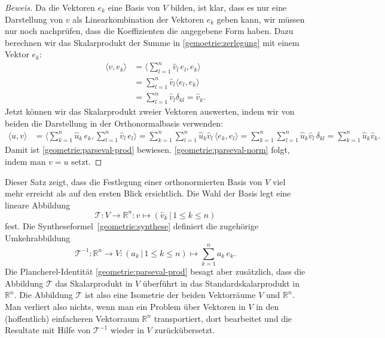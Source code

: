 \begin{proof}[Beweis]
Da die Vektoren $e_k$ eine Basis von $V$ bilden, ist klar, dass es nur
eine Darstellung von $v$ als Linearkombination der Vektoren $e_k$ geben
kann, wir müssen nur noch nachprüfen, dass die Koeffizienten die angegebene
Form haben.
Dazu berechnen wir das Skalarprodukt der Summe in \eqref{gemoetrie:zerlegung}
mit einem Vektor $e_k$:
\begin{align*}
\langle v,e_k\rangle
&=
\biggl\langle \sum_{l=1}^n \hat{v}_l\, e_l,e_k\biggr\rangle
\\
&=
\sum_{l=1}^n \hat{v}_l\langle e_l,e_k\rangle
\\
&=
\sum_{l=1}^n \hat{v}_l\delta_{kl}
=
\hat{v}_k.
\end{align*}
Jetzt können wir das Skalarprodukt zweier Vektoren auswerten, indem
wir von beiden die Darstellung in der Orthonormalbasis verwenden:
\begin{align*}
\langle u,v\rangle
&=
\biggl\langle
\sum_{k=1}^n \hat{u}_k\, e_k,\sum_{l=1}^n \hat{v}_l\, e_l
\biggr\rangle
=
\sum_{k=1}^n \sum_{l=1}^n \hat{u}_k\hat{v}_l\, \langle e_k,e_l\rangle
=
\sum_{k=1}^n \sum_{l=1}^n \hat{u}_k\hat{v}_l\, \delta_{kl}
=
\sum_{k=1}^n \hat{u}_k\hat{v}_k.
\end{align*}
Damit ist \eqref{geometrie:parseval-prod} bewiesen.
\eqref{geometrie:parseval-norm} folgt, indem man $v=u$ setzt.
\end{proof}

Dieser Satz zeigt, dass die Festlegung einer orthonormierten Basis von $V$
viel mehr erreicht als auf den ersten Blick ersichtlich.
Die Wahl der Basis legt eine lineare Abbildung
\[
\mathcal{T}
\colon
V\to \mathbb R^n
:
v \mapsto (\hat{v}_k\,|\, 1\le k\le n)
\]
fest.
Die Syntheseformel~\eqref{geometrie:synthese} definiert die zugehörige
Umkehrabbildung
\[
\mathcal{T}^{-1}
\colon
\mathbb R^n \to V
:
(a_k\,|\,1\le k \le n)
\mapsto
\sum_{k=1}^n a_k\,e_k.
\]
Die Plancherel-Identität
\eqref{geometrie:parseval-prod} besagt aber zusätzlich, dass
die Abbildung $\mathcal{T}$ das Skalarprodukt in $V$ überführt in
das Standardskalarprodukt in $\mathbb R^n$.
Die Abbildung $\mathcal{T}$ ist also eine Isometrie der beiden Vektorräume
$V$ und $\mathbb R^n$.
Man verliert also nichts, wenn man ein Problem über Vektoren in $V$ in
den (hoffentlich) einfacheren Vektorraum $\mathbb R^n$ transportiert,
dort bearbeitet und die Resultate mit Hilfe von $\mathcal{T}^{-1}$
wieder in $V$ zurückübersetzt.



